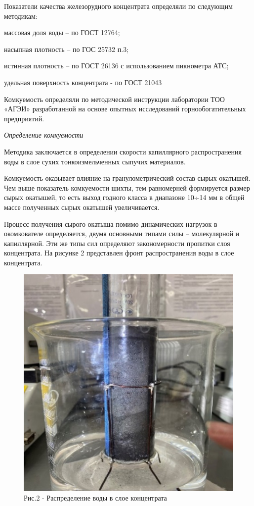 \begin{multicols}{2}
Показатели качества железорудного концентрата определяли по следующим
методикам:

массовая доля воды -- по ГОСТ 12764;

насыпная плотность -- по ГОС 25732 п.3;

истинная плотность -- по ГОСТ 26136 с использованием пикнометра АТС;

удельная поверхность концентрата - по ГОСТ 21043

Комкуемость определяли по методической инструкции лаборатории ТОО «АГЭИ»
разработанной на основе опытных исследований горнообогатительных
предприятий.

\emph{Определение комкуемости}

Методика заключается в определении скорости капиллярного распространения
воды в слое сухих тонкоизмельченных сыпучих материалов.

Комкуемость оказывает влияние на гранулометрический состав сырых
окатышей. Чем выше показатель комкуемости шихты, тем равномерней
формируется размер сырых окатышей, то есть выход годного класса в
диапазоне 10÷14 мм в общей массе полученных сырых окатышей
увеличивается.

Процесс получения сырого окатыша помимо динамических нагрузок в
окомкователе определяется, двумя основными типами силы -- молекулярной и
капиллярной. Эти же типы сил определяют закономерности пропитки слоя
концентрата. На рисунке 2 представлен фронт распространения воды в слое
концентрата.

\begin{figure}[H]
	\centering
	\includegraphics[width=0.9\columnwidth]{media/chem2/image62}
	\caption*{Рис.2 - Распределение воды в слое концентрата}
\end{figure}


\end{multicols}
